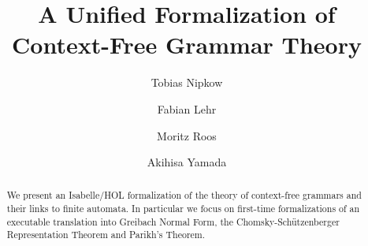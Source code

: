 \documentclass[runningheads]{llncs}
\begin{document}
\title{A Unified Formalization of Context-Free Grammar Theory}

\author{Tobias Nipkow \and
Fabian Lehr \and
Moritz Roos \and
Akihisa Yamada}
%


\maketitle

\begin{abstract}
We present an Isabelle/HOL formalization of the theory of context-free grammars and
their links to finite automata. In particular we focus on first-time
formalizations of an executable translation into Greibach Normal Form, the Chomsky-Sch\"utzenberger Representation Theorem and Parikh's Theorem.

\end{abstract}


%


\end{document}
